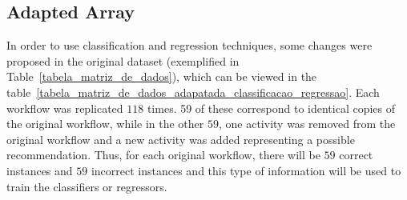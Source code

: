 \documentclass{RITA}
\begin{document}
\subsection{Adapted Array}
In order to use classification and regression techniques, some changes were proposed in the original dataset (exemplified in Table~\ref{tabela_matriz_de_dados}), which can be viewed in the table~\ref{tabela_matriz_de_dados_adapatada_classificacao_regressao}. Each workflow was replicated \(118\) times. 59 of these correspond to identical copies of the original workflow, while in the other \(59\), one activity was removed from the original workflow and a new activity was added representing a possible recommendation. Thus, for each original workflow, there will be \(59\) correct instances and \(59\) incorrect instances and this type of information will be used to train the classifiers or regressors.
\end{document}
